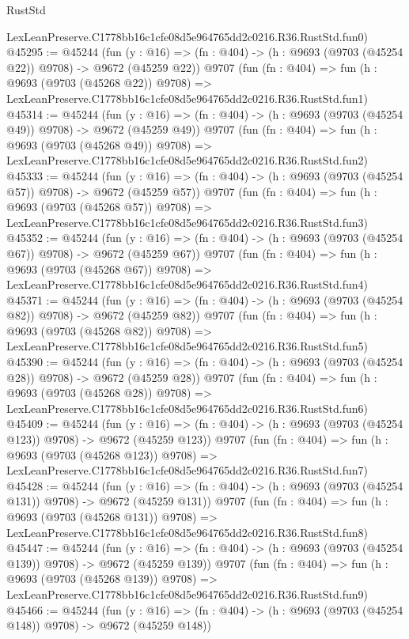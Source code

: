 \begin{lexlean}{RustStd}
\begin{coremodule}
    LexLeanPreserve.C1778bb16c1cfe08d5e964765dd2c0216.R36.RustStd.fun0)
@45295 := @45244
    (fun (y : @16) => (fn : @404) -> (h : @9693 (@9703 (@45254 @22)) @9708) -> @9672 (@45259 @22))
    @9707
    (fun (fn : @404) =>
    fun (h : @9693 (@9703 (@45268 @22)) @9708) =>
    LexLeanPreserve.C1778bb16c1cfe08d5e964765dd2c0216.R36.RustStd.fun1)
@45314 := @45244
    (fun (y : @16) => (fn : @404) -> (h : @9693 (@9703 (@45254 @49)) @9708) -> @9672 (@45259 @49))
    @9707
    (fun (fn : @404) =>
    fun (h : @9693 (@9703 (@45268 @49)) @9708) =>
    LexLeanPreserve.C1778bb16c1cfe08d5e964765dd2c0216.R36.RustStd.fun2)
@45333 := @45244
    (fun (y : @16) => (fn : @404) -> (h : @9693 (@9703 (@45254 @57)) @9708) -> @9672 (@45259 @57))
    @9707
    (fun (fn : @404) =>
    fun (h : @9693 (@9703 (@45268 @57)) @9708) =>
    LexLeanPreserve.C1778bb16c1cfe08d5e964765dd2c0216.R36.RustStd.fun3)
@45352 := @45244
    (fun (y : @16) => (fn : @404) -> (h : @9693 (@9703 (@45254 @67)) @9708) -> @9672 (@45259 @67))
    @9707
    (fun (fn : @404) =>
    fun (h : @9693 (@9703 (@45268 @67)) @9708) =>
    LexLeanPreserve.C1778bb16c1cfe08d5e964765dd2c0216.R36.RustStd.fun4)
@45371 := @45244
    (fun (y : @16) => (fn : @404) -> (h : @9693 (@9703 (@45254 @82)) @9708) -> @9672 (@45259 @82))
    @9707
    (fun (fn : @404) =>
    fun (h : @9693 (@9703 (@45268 @82)) @9708) =>
    LexLeanPreserve.C1778bb16c1cfe08d5e964765dd2c0216.R36.RustStd.fun5)
@45390 := @45244
    (fun (y : @16) => (fn : @404) -> (h : @9693 (@9703 (@45254 @28)) @9708) -> @9672 (@45259 @28))
    @9707
    (fun (fn : @404) =>
    fun (h : @9693 (@9703 (@45268 @28)) @9708) =>
    LexLeanPreserve.C1778bb16c1cfe08d5e964765dd2c0216.R36.RustStd.fun6)
@45409 := @45244
    (fun (y : @16) => (fn : @404) -> (h : @9693 (@9703 (@45254 @123)) @9708) -> @9672 (@45259 @123))
    @9707
    (fun (fn : @404) =>
    fun (h : @9693 (@9703 (@45268 @123)) @9708) =>
    LexLeanPreserve.C1778bb16c1cfe08d5e964765dd2c0216.R36.RustStd.fun7)
@45428 := @45244
    (fun (y : @16) => (fn : @404) -> (h : @9693 (@9703 (@45254 @131)) @9708) -> @9672 (@45259 @131))
    @9707
    (fun (fn : @404) =>
    fun (h : @9693 (@9703 (@45268 @131)) @9708) =>
    LexLeanPreserve.C1778bb16c1cfe08d5e964765dd2c0216.R36.RustStd.fun8)
@45447 := @45244
    (fun (y : @16) => (fn : @404) -> (h : @9693 (@9703 (@45254 @139)) @9708) -> @9672 (@45259 @139))
    @9707
    (fun (fn : @404) =>
    fun (h : @9693 (@9703 (@45268 @139)) @9708) =>
    LexLeanPreserve.C1778bb16c1cfe08d5e964765dd2c0216.R36.RustStd.fun9)
@45466 := @45244
    (fun (y : @16) => (fn : @404) -> (h : @9693 (@9703 (@45254 @148)) @9708) -> @9672 (@45259 @148))

\end{coremodule}
\end{lexlean}
